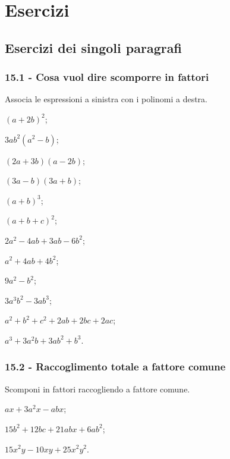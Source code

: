 \section{Esercizi}
\subsection{Esercizi dei singoli paragrafi}
\subsubsection*{15.1 - Cosa vuol dire scomporre in fattori}

\begin{esercizio}
\label{ese:15.1}
Associa le espressioni a sinistra con i polinomi a destra.
  \begin{multicols}{2}
\begin{enumeratea}
\item $(a+2b)^{2}$;
\item $3ab^{2}(a^{2}-b)$;
\item $(2a+3b)(a-2b)$;
\item $(3a-b)(3a+b)$;
\item $(a+b)^{3}$;
\item $(a+b+c)^{2}$;
\item $2a^{2}-4ab+3ab-6b^{2}$;
\item $a^{2}+4ab+4b^{2}$;
\item $9a^{2}-b^{2}$;
\item $3a^{3}b^{2}-3ab^{3}$;
\item $a^{2}+b^{2}+c^{2}+2ab+2bc+2ac$;
\item $a^{3}+3a^{2}b+3ab^{2}+b^{3}$.
\end{enumeratea}
  \end{multicols}
\end{esercizio}

\subsubsection*{15.2 - Raccoglimento totale a fattore comune}

\begin{esercizio}[\Ast]
\label{ese:15.2}
Scomponi in fattori raccogliendo a fattore comune.
\begin{multicols}{2}
\begin{enumeratea}
 \item $ax+3a^{2}x-abx$;
 \item $15b^{2}+12bc+21abx+6ab^{2}$;
 \item $15x^{2}y-10xy+25x^{2}y^{2}$.
\end{enumeratea}
\end{multicols}
\end{esercizio}

